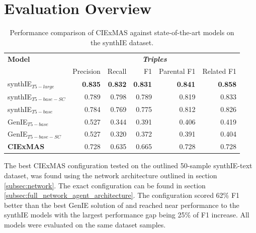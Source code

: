 \documentclass[a4paper,oneside,bibliography=totoc]{scrbook}
\begin{document}
\section{Evaluation Overview}
\label{sec:evaluation_overview}

\begin{table}[h]
  \centering
  \begin{tabular}{l|rrrrr}
    \toprule
    \textbf{Model}         & \multicolumn{5}{c}{\textit{\textbf{Triples}}}                                                                     \\
                           & Precision                                     & Recall         & F1             & Parental F1    & Related F1     \\
    \midrule
    synthIE$_{T5-large}$   & \textbf{0.835}                                & \textbf{0.832} & \textbf{0.831} & \textbf{0.841} & \textbf{0.858} \\
    synthIE$_{T5-base-SC}$ & 0.789                                         & 0.798          & 0.789          & 0.819          & 0.833          \\
    synthIE$_{T5-base}$    & 0.784                                         & 0.769          & 0.775          & 0.812          & 0.826          \\
    GenIE$_{T5-base}$      & 0.527                                         & 0.344          & 0.391          & 0.406          & 0.419          \\
    GenIE$_{T5-base-SC}$   & 0.527                                         & 0.320          & 0.372          & 0.391          & 0.404          \\
    \midrule
    \textbf{CIExMAS}       & 0.728                                         & 0.635          & 0.665          & 0.728          & 0.728          \\
    \bottomrule
  \end{tabular}
  \caption{Performance comparison of CIExMAS against state-of-the-art models on the synthIE dataset.}
  \label{tab:evaluation_overview}
\end{table}

The best CIExMAS configuration tested on the outlined 50-sample synthIE-text dataset, was found using the network architecture outlined in section \ref{subsec:network}. The exact configuration can be found in section \ref{subsec:full_network_agent_architecture}. The configuration scored 62\% F1 better than the best GenIE solution of \citet{Josifoski2021} and reached near performance to the synthIE models with the largest performance gap being 25\% of F1 increase. All models were evaluated on the same dataset samples.
\end{document}

